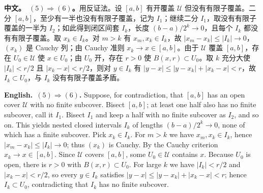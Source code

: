 \documentclass[UTF8,11pt,a4paper]{ctexart}
\newcommand{\BOTH}[2]{\par\noindent\textbf{中文。}\ #1\par\noindent\textbf{English.}\ #2\par}
\begin{document}
\BOTH{\textbf{$(5)\Rightarrow(6)$。}用反证法。设 $[a,b]$ 有开覆盖 $\mathcal U$ 但没有有限子覆盖。二分 $[a,b]$，至少有一半也没有有限子覆盖，记为 $I_1$；继续二分 $I_1$，取没有有限子覆盖的一半为 $I_2$；如此得到闭区间套 $I_k$，长度 $(b-a)/2^{k}\to0$，且每个 $I_k$ 都没有有限子覆盖。取 $x_k\in I_k$。对 $m>k$ 有 $x_m,x_k\in I_k$，故 $|x_m-x_k|\le|I_k|\to0$，$(x_k)$ 是 Cauchy 列；由 Cauchy 准则 $x_k\to x\in[a,b]$。由于 $\mathcal U$ 覆盖 $[a,b]$，存在 $U_0\in\mathcal U$ 使 $x\in U_0$；由 $U_0$ 开，存在 $r>0$ 使 $B(x,r)\subset U_0$。取 $k$ 充分大使 $|I_k|<r/2$ 且 $|x_k-x|<r/2$，则对 $y\in I_k$ 有 $|y-x|\le|y-x_k|+|x_k-x|<r$，故 $I_k\subset U_0$，与 $I_k$ 没有有限子覆盖矛盾。}{\textbf{$(5)\Rightarrow(6)$.} Suppose, for contradiction, that $[a,b]$ has an open cover $\mathcal U$ with no finite subcover. Bisect $[a,b]$; at least one half also has no finite subcover, call it $I_1$. Bisect $I_1$ and keep a half with no finite subcover as $I_2$, and so on. This yields nested closed intervals $I_k$ of lengths $(b-a)/2^{k}\to0$, none of which has a finite subcover. Pick $x_k\in I_k$. For $m>k$ we have $x_m,x_k\in I_k$, hence $|x_m-x_k|\le|I_k|\to0$; thus $(x_k)$ is Cauchy. By the Cauchy criterion $x_k\to x\in[a,b]$. Since $\mathcal U$ covers $[a,b]$, some $U_0\in\mathcal U$ contains $x$. Because $U_0$ is open, there is $r>0$ with $B(x,r)\subset U_0$. For large $k$ we have $|I_k|<r/2$ and $|x_k-x|<r/2$, so every $y\in I_k$ satisfies $|y-x|\le|y-x_k|+|x_k-x|<r$; hence $I_k\subset U_0$, contradicting that $I_k$ has no finite subcover.}
\end{document}

